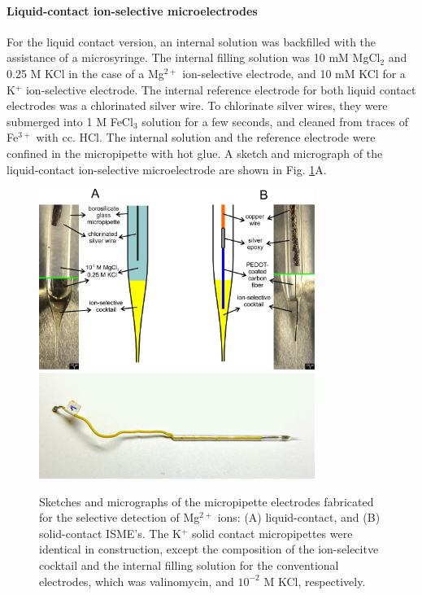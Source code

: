 				\paragraph{Liquid-contact ion-selective microelectrodes}
For the liquid contact version, an internal solution was backfilled with the assistance of a microsyringe.
The internal filling solution was 10 mM MgCl$_2$ and 0.25 M KCl in the case of a Mg$^{2+}$ ion-selective electrode, and 10 mM KCl for a K$^+$ ion-selective electrode.
The internal reference electrode for both liquid contact electrodes was a chlorinated silver wire.
To chlorinate silver wires, they were submerged into 1 M FeCl$_3$ solution for a few seconds, and cleaned from traces of Fe$^{3+}$ with cc. HCl.
The internal solution and the reference electrode were confined in the micropipette with hot glue.
A sketch and micrograph of the liquid-contact ion-selective microelectrode are shown in Fig. \ref{fig:solid_liquid}A.

\begin{figure}
\centering
\includegraphics[width=0.8\textwidth]{img/liquid_solid.jpg}
\includegraphics[width=0.8\textwidth]{img/mg_top.jpg}
\caption[Sketches and micrographs of the micropipette electrodes fabricated for the selective detection of Mg$^{2+}$ ions.]{Sketches and micrographs of the micropipette electrodes fabricated for the selective detection of Mg$^{2+}$ ions: (A) liquid-contact, and (B) solid-contact ISME's.
The K$^+$ solid contact micropipettes were identical in construction, except the composition of the ion-selecitve cocktail and the internal filling solution for the conventional electrodes, which was valinomycin, and $10^{-2}$ M KCl, respectively.}
\label{fig:solid_liquid}
\end{figure}

